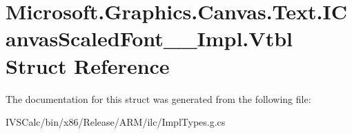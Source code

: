 \hypertarget{struct_microsoft_1_1_graphics_1_1_canvas_1_1_text_1_1_i_canvas_scaled_font_____impl_1_1_vtbl}{}\section{Microsoft.\+Graphics.\+Canvas.\+Text.\+I\+Canvas\+Scaled\+Font\+\_\+\+\_\+\+Impl.\+Vtbl Struct Reference}
\label{struct_microsoft_1_1_graphics_1_1_canvas_1_1_text_1_1_i_canvas_scaled_font_____impl_1_1_vtbl}


The documentation for this struct was generated from the following file\+:\begin{DoxyCompactItemize}
\item 
I\+V\+S\+Calc/bin/x86/\+Release/\+A\+R\+M/ilc/Impl\+Types.\+g.\+cs\end{DoxyCompactItemize}
